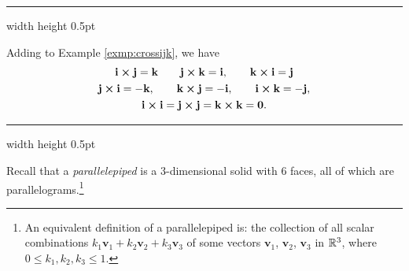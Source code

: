 \smallskip
\hrule width \textwidth height 0.5pt
\begin{exmp}\label{exmp:crossijkfull}
 Adding to Example \ref{exmp:crossijk}, we have
 \begin{gather*}
  \textbf{i} \bm{\times} \textbf{j} = \textbf{k} \qquad \textbf{j} \bm{\times} \textbf{k} = \textbf{i}, 
  \qquad
   \textbf{k} \bm{\times} \textbf{i} = \textbf{j}\\
  \textbf{j} \bm{\times} \textbf{i} = -\textbf{k}, 
  \qquad \textbf{k} \bm{\times} \textbf{j} = -\textbf{i}, 
  \qquad
   \textbf{i} \bm{\times} \textbf{k} = -\textbf{j},
   \\
  \textbf{i} \bm{\times} \textbf{i} = \textbf{j} \bm{\times} \textbf{j} = \textbf{k} \bm{\times} \textbf{k} =
  \textbf{0}.
 \end{gather*}
\end{exmp}
\hrule width \textwidth height 0.5pt
\medskip

Recall that a \emph{parallelepiped} is a 3-dimensional solid with 6 faces, all of
which are parallelograms.\footnote{An equivalent definition of a  parallelepiped is: the collection of
all scalar combinations $k_{1}\textbf{v}_{1} + k_{2}\textbf{v}_{2} + k_{3}\textbf{v}_{3}$ of some vectors
$\textbf{v}_{1}$, $\textbf{v}_{2}$, $\textbf{v}_{3}$ in $\mathbb{R}^{3}$, where $0 \le k_{1}, k_{2}, k_{3} \le 1$.}

